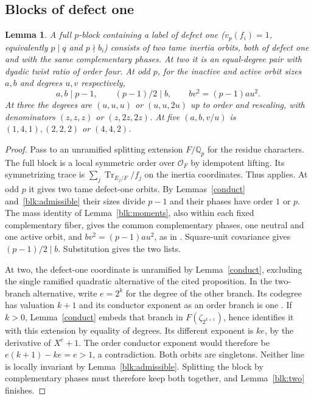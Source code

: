 \documentclass[11pt]{amsart}
\numberwithin{equation}{section}
\newtheorem{lemma}[theorem]{Lemma}
\theoremstyle{definition}
\theoremstyle{plain}
\DeclareMathOperator{\Tr}{Tr}
\newcommand{\QQ}{\mathbb Q}
\begin{document}
\subsection{Blocks of defect one}
\begin{lemma}\label{blk:defectone}
A full $p$-block containing a label of defect one ($v_p(f_i)=1$,
equivalently $p\mid q$ and $p\nmid b_i$) consists of two tame inertia
orbits, both of defect one and with the same complementary phases.
At two it is an equal-degree pair with dyadic twist ratio of order
four. At odd $p$, for the inactive and active orbit sizes $a,b$
and degrees $u,v$ respectively,
\[
 a,b\mid p-1,\qquad (p-1)/2\mid b,\qquad bv^2=(p-1)au^2 .
\]
At three the degrees are $(u,u,u)$ or $(u,u,2u)$ up to order and
rescaling, with denominators $(z,z,z)$ or $(z,2z,2z)$.
At five $(a,b,v/u)$ is $(1,4,1),(2,2,2)$ or $(4,4,2)$.
\end{lemma}
\begin{proof}
Pass to an unramified splitting extension $F/\QQ_p$ for the residue
characters. The full block is a local symmetric order over $\mathcal O_F$
by idempotent lifting. Its symmetrizing trace is
$\sum_j\Tr_{E_j/F}/f_j$ on the inertia coordinates. Thus
\cite[Proposition~2.13]{BDPcore} applies. At odd $p$ it gives two
tame defect-one orbits. By Lemmas~\ref{conduct} and~\ref{blk:admissible}
their sizes divide $p-1$ and their phases have order $1$ or $p$.
The mass identity of Lemma~\ref{blk:moments}, also within each fixed
complementary fiber, gives the common complementary phases, one neutral
and one active orbit, and $bv^2=(p-1)au^2$, as in
\cite[Corollary~3.10]{BDPcore}. Square-unit covariance gives
$(p-1)/2\mid b$. Substitution gives the two lists.

At two, the defect-one coordinate is unramified by
Lemma~\ref{conduct}, excluding the single ramified quadratic alternative
of the cited proposition. In the two-branch alternative, write
$e=2^k$ for the degree of the other branch. Its codegree has valuation
$k+1$ and its conductor exponent as an order branch is one
\cite[Lemma~2.12 and Proposition~2.13]{BDPcore}. If $k>0$,
Lemma~\ref{conduct} embeds that branch in $F(\zeta_{2^{k+1}})$, hence
identifies it with this extension by equality of degrees. Its different
exponent is $ke$, by the derivative of $X^e+1$. The order conductor
exponent would therefore be $e(k+1)-ke=e>1$, a contradiction. Both
orbits are singletons. Neither line is locally invariant by
Lemma~\ref{blk:admissible}. Splitting the block by complementary phases
must therefore keep both together, and Lemma~\ref{blk:two} finishes.
\end{proof}
\end{document}
